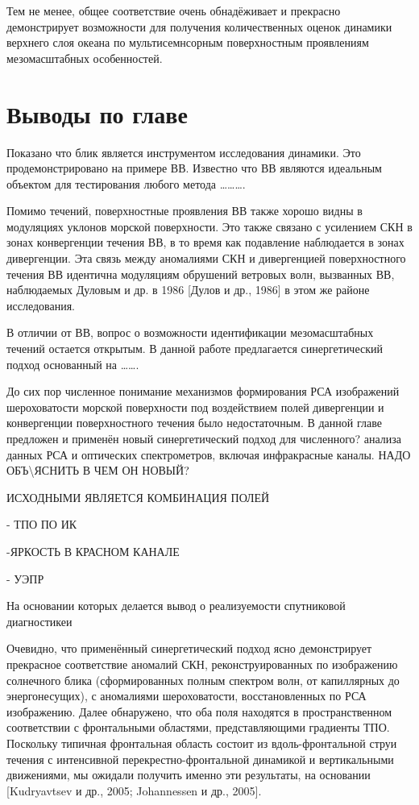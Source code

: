Тем не менее, общее соответствие очень обнадёживает и прекрасно демонстрирует возможности для получения количественных оценок динамики верхнего слоя океана по мультисемнсорным поверхностным проявлениям мезомасштабных особенностей.



\newpage


\section{Выводы по главе} \label{sec:3.4}


Показано что блик является инструментом исследования динамики. Это продемонстрировано на примере ВВ. Известно что ВВ являются идеальным объектом для тестирования любого метода \dots \dots \dots .

Помимо течений, поверхностные проявления ВВ также хорошо видны в модуляциях уклонов морской поверхности. Это также связано с усилением СКН в зонах конвергенции течения ВВ, в то время как подавление наблюдается в зонах дивергенции. Эта связь между аномалиями СКН и дивергенцией поверхностного течения ВВ идентична модуляциям обрушений ветровых волн, вызванных ВВ, наблюдаемых Дуловым и др. в 1986 [Дулов и др., 1986] в этом же районе исследования.



В отличии от ВВ, вопрос о возможности идентификации мезомасштабных течений остается открытым. В данной работе предлагается синергетический подход основанный на \dots \dots .

 

До сих пор численное понимание механизмов формирования РСА изображений шероховатости морской поверхности под воздействием полей дивергенции и конвергенции поверхностного течения было недостаточным. В данной главе предложен и применён новый синергетический подход для численного? анализа данных РСА и оптических спектрометров, включая инфракрасные каналы. НАДО ОБЪ\textbackslash ЯСНИТЬ В ЧЕМ ОН НОВЫЙ?

ИСХОДНЫМИ ЯВЛЯЕТСЯ КОМБИНАЦИЯ ПОЛЕЙ

- ТПО ПО ИК

-ЯРКОСТЬ В КРАСНОМ КАНАЛЕ

- УЭПР 



На основании которых делается вывод о реализуемости спутниковой диагностикеи 

Очевидно, что применённый синергетический подход ясно демонстрирует прекрасное соответствие аномалий СКН, реконструированных по изображению солнечного блика (сформированных полным спектром волн, от капиллярных до энергонесущих), с аномалиями шероховатости, восстановленных по РСА изображению. Далее обнаружено, что оба поля находятся в пространственном соответствии с фронтальными областями, представляющими градиенты ТПО. Поскольку типичная фронтальная область состоит из вдоль-фронтальной струи течения с интенсивной перекрестно-фронтальной динамикой и вертикальными движениями, мы ожидали получить именно эти результаты, на основании [Kudryavtsev и др., 2005; Johannessen и др., 2005].

